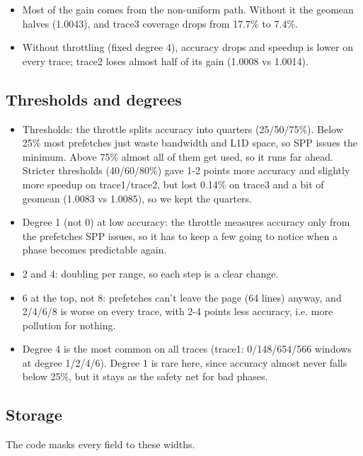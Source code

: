 \documentclass[10pt]{article}
\providecommand{\tightlist}{%
  \setlength{\itemsep}{2pt}\setlength{\parskip}{0pt}}
\begin{document}
\begin{itemize}
\tightlist
\item Most of the gain comes from the non-uniform path. Without it the geomean halves (1.0043), and trace3 coverage drops from 17.7\% to 7.4\%.
\item Without throttling (fixed degree 4), accuracy drops and speedup is lower on every trace; trace2 loses almost half of its gain (1.0008 vs 1.0014).
\end{itemize}

\subsection{Thresholds and degrees}

\begin{itemize}
\tightlist
\item Thresholds: the throttle splits accuracy into quarters (25/50/75\%). Below 25\% most prefetches just waste bandwidth and L1D space, so SPP issues the minimum. Above 75\% almost all of them get used, so it runs far ahead. Stricter thresholds (40/60/80\%) gave 1-2 points more accuracy and slightly more speedup on trace1/trace2, but lost 0.14\% on trace3 and a bit of geomean (1.0083 vs 1.0085), so we kept the quarters.
\item Degree 1 (not 0) at low accuracy: the throttle measures accuracy only from the prefetches SPP issues, so it has to keep a few going to notice when a phase becomes predictable again.
\item 2 and 4: doubling per range, so each step is a clear change.
\item 6 at the top, not 8: prefetches can't leave the page (64 lines) anyway, and 2/4/6/8 is worse on every trace, with 2-4 points less accuracy, i.e. more pollution for nothing.
\item Degree 4 is the most common on all traces (trace1: 0/148/654/566 windows at degree 1/2/4/6). Degree 1 is rare here, since accuracy almost never falls below 25\%, but it stays as the safety net for bad phases.
\end{itemize}

\subsection{Storage}

The code masks every field to these widths.
\end{document}
